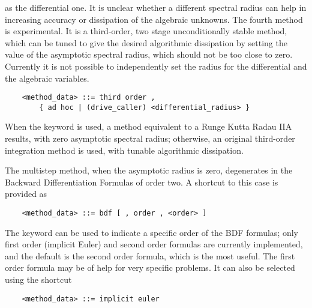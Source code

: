 as the differential one.
It is unclear whether a different spectral radius can help in increasing
accuracy or dissipation of the algebraic unknowns.
The fourth method is experimental. It is a third-order,
two stage unconditionally stable method, which can be tuned to give 
the desired algorithmic dissipation by setting the value 
of the asymptotic spectral radius, which should not be 
too close to zero.
Currently it is not possible to independently set the radius 
for the differential and the algebraic variables.
\begin{verbatim}
    <method_data> ::= third order ,
        { ad hoc | (drive_caller) <differential_radius> }
\end{verbatim}
When the keyword  is used, a method equivalent
to a Runge Kutta Radau IIA results, with zero asymptotic
spectral radius; otherwise, an original third-order
integration method is used, with tunable algorithmic dissipation.

\noindent
The multistep method, when the asymptotic radius is zero, degenerates
in the Backward Differentiation Formulas of order two.
A shortcut to this case is provided as
\begin{verbatim}
    <method_data> ::= bdf [ , order , <order> ]
\end{verbatim}
The keyword  can be used to indicate a specific order
of the BDF formulas; only first order (implicit Euler) and 
second order formulas are currently implemented, and the default
is the second order formula, which is the most useful.
The first order formula may be of help for very specific problems.
It can also be selected using the shortcut
\begin{verbatim}
    <method_data> ::= implicit euler
\end{verbatim}

